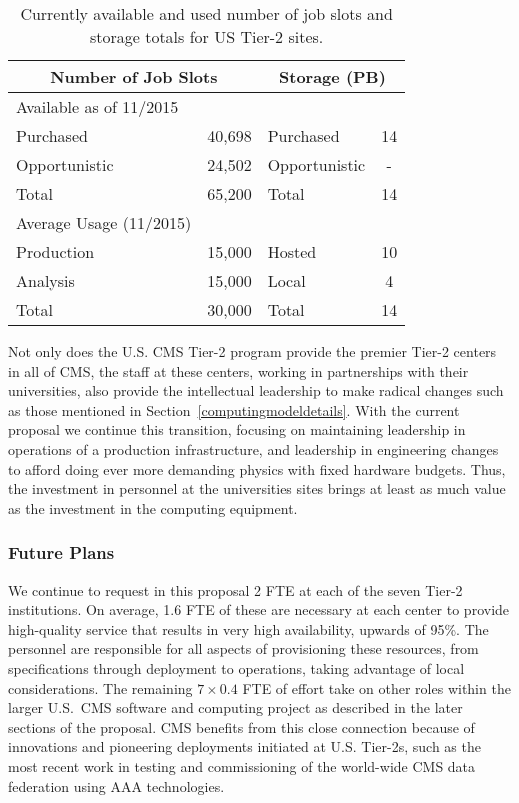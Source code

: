 \documentclass[11pt,a4paper]{article}
\begin{document}
\begin{table}
\begin{center}
\begin{tabular}{|l|c|l|c|}
\hline
\multicolumn{2}{|c|}{Number of Job Slots} &  \multicolumn{2}{|c|}{Storage (PB)} \\ \hline
Available as of 11/2015 &          &               &    \\
Purchased     & 40,698             & Purchased     & 14 \\
Opportunistic & 24,502             & Opportunistic & -  \\
Total         & 65,200             & Total         & 14 \\ \hline
Average Usage (11/2015) &          &               &    \\
Production    & 15,000             & Hosted        & 10 \\
Analysis      & 15,000             & Local         &  4 \\
Total         & 30,000             & Total         & 14 \\ \hline
\end{tabular}
\caption[]
{
Currently available and used number of job slots and storage totals
for US Tier-2 sites.
}
\label{current-resources}
\end{center}
\end{table}

Not only does the U.S. CMS Tier-2 program provide the premier Tier-2
centers in all of CMS, the staff at these centers, working in partnerships
with their universities, also provide the intellectual leadership to make
radical changes such as those mentioned in 
Section~\ref{computingmodeldetails}.  With the current proposal we continue
this transition, focusing on maintaining leadership in operations of a
production infrastructure, and leadership in engineering changes to afford
doing ever more demanding physics with fixed hardware budgets.  Thus, the
investment in personnel at the universities sites brings at least as much
value as the investment in the computing equipment.

\subsubsection{Future Plans}

We continue to request in this proposal 2 FTE at each of the seven Tier-2
institutions.  On average, 1.6 FTE of these are necessary at each center to
provide high-quality service that results in very high availability,
upwards of 95\%. The personnel are responsible for all aspects of
provisioning these resources, from specifications through deployment to
operations, taking advantage of local considerations.  The remaining
$7 \times 0.4$ FTE of effort take on other roles within the larger U.S.~CMS
software and computing project as described in the later sections of
the proposal.  CMS benefits from this close connection because of
innovations and pioneering deployments initiated at U.S. Tier-2s, such as the
most recent work in testing and commissioning of the world-wide CMS data
federation using AAA technologies.
\end{document}
